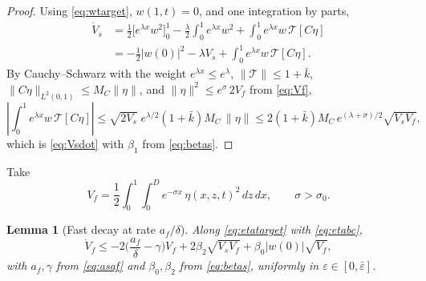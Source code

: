 \documentclass[12pt]{article}
\theoremstyle{plain}
\newtheorem{lemma}{Lemma}
\theoremstyle{remark}
\newcommand{\TT}{\mathcal T}
\begin{document}
\begin{proof}
Using \eqref{eq:wtarget}, $w(1,t)=0$, and one integration by parts,
\begin{align}
 \dot V_s
 &=\frac12\big[e^{\lambda x}w^2\big]_0^1-\frac\lambda2\int_0^1e^{\lambda x}w^2
 +\int_0^1e^{\lambda x}w\,\TT[C\eta]
 \nonumber\\
 &=-\frac12|w(0)|^2-\lambda V_s+\int_0^1e^{\lambda x}w\,\TT[C\eta] .
 \label{eq:Vsdotexact}
\end{align}
By Cauchy--Schwarz with the weight $e^{\lambda x}\le e^{\lambda}$, $\|\TT\|\le1+\bar k$, $\|C\eta\|_{L^2(0,1)}\le M_C\|\eta\|$, and $\|\eta\|^2\le e^{\sigma}\,2V_f$ from \eqref{eq:Vf},
\begin{equation}
 \left|\int_0^1e^{\lambda x}w\,\TT[C\eta]\right|
 \le\sqrt{2V_s}\;e^{\lambda/2}(1+\bar k)M_C\,\|\eta\|
 \le2(1+\bar k)M_C\,e^{(\lambda+\sigma)/2}\sqrt{V_sV_f},
 \label{eq:slowcross}
\end{equation}
which is \eqref{eq:Vsdot} with $\beta_1$ from \eqref{eq:betas}.
\end{proof}

Take
\begin{equation}
 V_f=\frac12\int_0^1\int_0^De^{-\sigma x}\,\eta(x,z,t)^2\,dz\,dx,\qquad\sigma>\sigma_0 .
 \label{eq:Vf}
\end{equation}

\begin{lemma}[Fast decay at rate $a_f/\delta$]\label{lem:fast}
Along \eqref{eq:etatarget} with \eqref{eq:etabc},
\begin{equation}
 \dot V_f
 \le-2\Big(\frac{a_f}{\delta}-\gamma\Big)V_f
 +2\beta_2\sqrt{V_sV_f}
 +\beta_0|w(0)|\sqrt{V_f},
 \label{eq:Vfdot}
\end{equation}
with $a_f,\gamma$ from \eqref{eq:asaf} and $\beta_0,\beta_2$ from \eqref{eq:betas}, uniformly in $\varepsilon\in[0,\bar\varepsilon]$.
\end{lemma}
\end{document}
